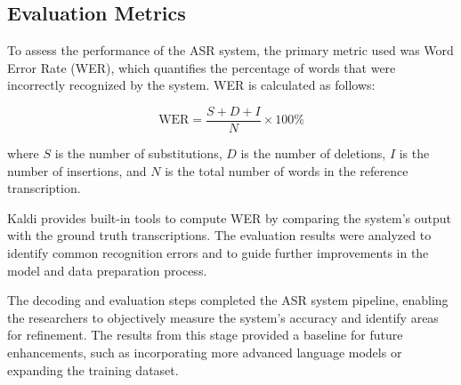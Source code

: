 \subsection{Evaluation Metrics}
To assess the performance of the ASR system, the primary metric used was Word Error Rate (WER), which quantifies the percentage of words that were incorrectly recognized by the system. WER is calculated as follows:

\[
\text{WER} = \frac{S + D + I}{N} \times 100\%
\]

where \( S \) is the number of substitutions, \( D \) is the number of deletions, \( I \) is the number of insertions, and \( N \) is the total number of words in the reference transcription.

Kaldi provides built-in tools to compute WER by comparing the system’s output with the ground truth transcriptions. The evaluation results were analyzed to identify common recognition errors and to guide further improvements in the model and data preparation process.

The decoding and evaluation steps completed the ASR system pipeline, enabling the researchers to objectively measure the system’s accuracy and identify areas for refinement. The results from this stage provided a baseline for future enhancements, such as incorporating more advanced language models or expanding the training dataset.